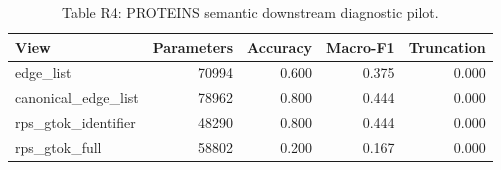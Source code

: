 \begin{table}[t]
\centering
\caption{Table R4: PROTEINS semantic downstream diagnostic pilot.}
\begin{tabular}{lrrrr}
\toprule
View & Parameters & Accuracy & Macro-F1 & Truncation \\
\midrule
edge\_list & 70994 & 0.600 & 0.375 & 0.000 \\
canonical\_edge\_list & 78962 & 0.800 & 0.444 & 0.000 \\
rps\_gtok\_identifier & 48290 & 0.800 & 0.444 & 0.000 \\
rps\_gtok\_full & 58802 & 0.200 & 0.167 & 0.000 \\
\bottomrule
\end{tabular}
\end{table}
